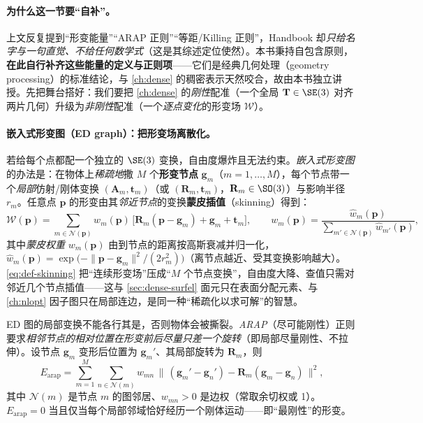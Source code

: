 \paragraph{为什么这一节要“自补”。}
上文反复提到“形变能量”“ARAP 正则”“等距/Killing 正则”，Handbook 却\emph{只给名字与一句直觉、不给任何数学式}（这是其综述定位使然）。本书秉持自包含原则，\textbf{在此自行补齐这些能量的定义与正则项}——它们是经典几何处理（geometry processing）的标准结论，与 \cref{ch:dense} 的稠密表示天然咬合，故由本书独立讲授。先把舞台搭好：我们要把 \cref{ch:dense} 的\emph{刚性}配准（一个全局 $\mathbf{T}\in\SE(3)$ 对齐两片几何）升级为\emph{非刚性}配准（一个\emph{逐点变化}的形变场 $\mathcal{W}$）。

\paragraph{嵌入式形变图（ED graph）：把形变场离散化。}
若给每个点都配一个独立的 $\SE(3)$ 变换，自由度爆炸且无法约束。\emph{嵌入式形变图}\cite{sumner2007embedded} 的办法是：在物体上\emph{稀疏地}撒 $M$ 个\textbf{形变节点} $\mathbf{g}_m$（$m=1,\dots,M$），每个节点带一个\emph{局部}仿射/刚体变换 $(\mathbf{A}_m,\mathbf{t}_m)$（或 $(\mathbf{R}_m,\mathbf{t}_m)$，$\mathbf{R}_m\in\SO(3)$）与影响半径 $r_m$。任意点 $\mathbf{p}$ 的形变由其\emph{邻近节点}的变换\textbf{蒙皮插值}（skinning）得到：
\begin{equation}
  \mathcal{W}(\mathbf{p})=\sum_{m\in\mathcal{N}(\mathbf{p})} w_m(\mathbf{p})\,\big[\mathbf{R}_m(\mathbf{p}-\mathbf{g}_m)+\mathbf{g}_m+\mathbf{t}_m\big],
  \qquad
  w_m(\mathbf{p})=\frac{\hat w_m(\mathbf{p})}{\sum_{m'\in\mathcal{N}(\mathbf{p})}\hat w_{m'}(\mathbf{p})},
  \label{eq:def-skinning}
\end{equation}
其中\emph{蒙皮权重} $w_m(\mathbf{p})$ 由到节点的距离按高斯衰减并归一化，$\hat w_m(\mathbf{p})=\exp\!\big(-\|\mathbf{p}-\mathbf{g}_m\|^2/(2 r_m^2)\big)$（离节点越近、受其变换影响越大）。\cref{eq:def-skinning} 把“连续形变场”压成“$M$ 个节点变换”，自由度大降、查值只需对邻近几个节点插值——这与 \cref{sec:dense-surfel} 面元只在表面分配元素、与 \cref{ch:nlopt} 因子图只在局部连边，是同一种“稀疏化以求可解”的智慧。

\begin{definition}\label{def:dyn-arap}
ED 图的局部变换不能各行其是，否则物体会被撕裂。\emph{ARAP}（尽可能刚性）正则\cite{sorkine2007arap} 要求\emph{相邻节点的相对位置在形变前后尽量只差一个旋转}（即局部尽量刚性、不拉伸）。设节点 $\mathbf{g}_m$ 变形后位置为 $\mathbf{g}_m'$、其局部旋转为 $\mathbf{R}_m$，则
\begin{equation}
  E_{\mathrm{arap}}
  =\sum_{m=1}^{M}\sum_{n\in\mathcal{N}(m)} w_{mn}\,
  \big\|\,(\mathbf{g}_m'-\mathbf{g}_n')-\mathbf{R}_m(\mathbf{g}_m-\mathbf{g}_n)\,\big\|^2,
  \label{eq:def-arap}
\end{equation}
其中 $\mathcal{N}(m)$ 是节点 $m$ 的图邻居、$w_{mn}>0$ 是边权（常取余切权或 1）。$E_{\mathrm{arap}}=0$ 当且仅当每个局部邻域恰好经历一个刚体运动——即“最刚性”的形变。
\end{definition}

